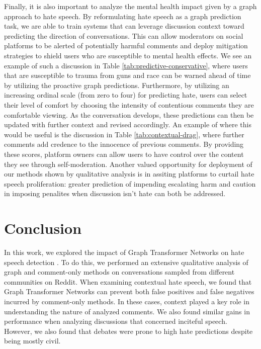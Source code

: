 \documentclass[letterpaper]{article} %
\newcommand{\edit}[1]{{#1}}
\begin{document}
Finally, it is also important to analyze the mental health impact given by a graph approach to hate speech. By reformulating hate speech as a graph prediction task, we are able to train systems that can leverage discussion context toward predicting the direction of conversations. This can allow moderators on social platforms to be alerted of potentially harmful comments and deploy mitigation strategies to shield users who are susceptible to mental health effects. We see an example of such a discussion in Table \ref{tab:predictive-conservative}, where users that are susceptible to trauma from guns and race can be warned ahead of time by utilizing the proactive graph predictions. Furthermore, by utilizing an increasing ordinal scale (from zero to four) for predicting hate, users can select their level of comfort by choosing the intensity of contentious comments they are comfortable viewing. As the conversation develops, these predictions can then be updated with further context and revised accordingly. An example of where this would be useful is the discussion in Table \ref{tab:contextual-drag}, where further comments add credence to the innocence of previous comments. \edit{By providing these scores, platform owners can allow users to have control over the content they see through self-moderation. Another valued opportunity for deployment of our methods shown by qualitative analysis is in assiting platforms to curtail hate speech proliferation: greater prediction of impending escalating harm and caution in imposing penalites when discussion isn't hate can both be addressed. }

\section{Conclusion}
In this work, we explored the impact of Graph Transformer Networks on hate speech detection \cite{hebert2022predicting}. To do this, we performed an extensive qualitative analysis of graph and comment-only methods on conversations sampled from different communities on Reddit. When examining contextual hate speech, we found that Graph Transformer Networks can prevent both false positives and false negatives incurred by comment-only methods. In these cases, context played a key role in understanding the nature of analyzed comments. We also found similar gains in performance when analyzing discussions that concerned inciteful speech. However, we also found that debates were prone to high hate predictions despite being mostly civil.
\end{document}
